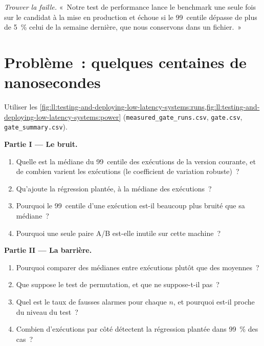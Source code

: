 \begin{exercise}[$\star\star\star$]\label{exo:ll:testing-and-deploying-low-latency-systems:8}
\emph{Trouver la faille.} «~Notre test de performance lance le benchmark une seule fois sur le candidat à la mise en production et échoue si le 99~centile
dépasse de plus de 5~\% celui de la semaine dernière, que nous conservons dans un fichier.~»
\end{exercise}

\section{Problème~: quelques centaines de nanosecondes}

\begin{problem}\label{pb:ll:testing-and-deploying-low-latency-systems:1}
Utiliser les \cref{fig:ll:testing-and-deploying-low-latency-systems:runs,fig:ll:testing-and-deploying-low-latency-systems:power}
(\texttt{measured\_gate\_runs.csv}, \texttt{gate.csv}, \texttt{gate\_summary.csv}).

\medskip\noindent\textbf{Partie I --- Le bruit.}
\begin{enumerate}
\item Quelle est la médiane du 99~centile des exécutions de la version courante, et de combien varient les exécutions (le coefficient de variation
robuste)~?
\item Qu'ajoute la régression plantée, à la médiane des exécutions~?
\item Pourquoi le 99~centile d'une exécution est-il beaucoup plus bruité que sa médiane~?
\item Pourquoi une seule paire A/B est-elle inutile sur cette machine~?
\end{enumerate}

\medskip\noindent\textbf{Partie II --- La barrière.}
\begin{enumerate}[resume]
\item Pourquoi comparer des médianes entre exécutions plutôt que des moyennes~?
\item Que suppose le test de permutation, et que ne suppose-t-il pas~?
\item Quel est le taux de fausses alarmes pour chaque $n$, et pourquoi est-il proche du niveau du test~?
\item Combien d'exécutions par côté détectent la régression plantée dans 99~\% des cas~?
\end{enumerate}


\end{problem}
